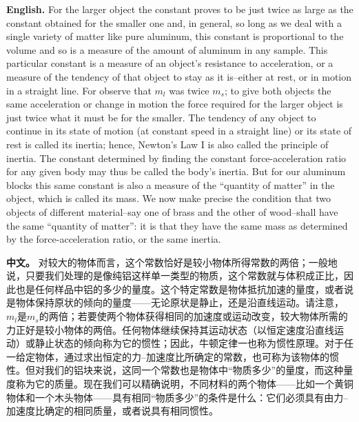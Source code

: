 \noindent\textbf{English.} For the larger object the constant proves to be just twice as large as the constant obtained for the smaller one and, in general, so long as we deal with a single variety of matter like pure aluminum, this constant is proportional to the volume and so is a measure of the amount of aluminum in any sample. This particular constant is a measure of an object's resistance to acceleration, or a measure of the tendency of that object to stay as it is--either at rest, or in motion in a straight line. For observe that $m_l$ was twice $m_s$; to give both objects the same acceleration or change in motion the force required for the larger object is just twice what it must be for the smaller. The tendency of any object to continue in its state of motion (at constant speed in a straight line) or its state of rest is called its inertia; hence, Newton's Law I is also called the principle of inertia. The constant determined by finding the constant force-acceleration ratio for any given body may thus be called the body's inertia. But for our aluminum blocks this same constant is also a measure of the ``quantity of matter'' in the object, which is called its mass. We now make precise the condition that two objects of different material--say one of brass and the other of wood--shall have the same ``quantity of matter'': it is that they have the same mass as determined by the force-acceleration ratio, or the same inertia.
\par\noindent\textbf{中文。} 对较大的物体而言，这个常数恰好是较小物体所得常数的两倍；一般地说，只要我们处理的是像纯铝这样单一类型的物质，这个常数就与体积成正比，因此也是任何样品中铝的多少的量度。这个特定常数是物体抵抗加速的量度，或者说是物体保持原状的倾向的量度——无论原状是静止，还是沿直线运动。请注意，$m_l$是$m_s$的两倍；若要使两个物体获得相同的加速度或运动改变，较大物体所需的力正好是较小物体的两倍。任何物体继续保持其运动状态（以恒定速度沿直线运动）或静止状态的倾向称为它的惯性；因此，牛顿定律一也称为惯性原理。对于任一给定物体，通过求出恒定的力--加速度比所确定的常数，也可称为该物体的惯性。但对我们的铝块来说，这同一个常数也是物体中“物质多少”的量度，而这种量度称为它的质量。现在我们可以精确说明，不同材料的两个物体——比如一个黄铜物体和一个木头物体——具有相同“物质多少”的条件是什么：它们必须具有由力--加速度比确定的相同质量，或者说具有相同惯性。
\medskip

